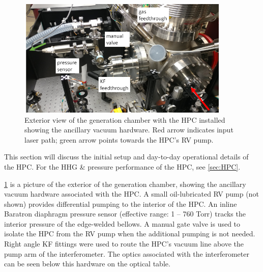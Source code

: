 \begin{figure}
	\centering
	\includegraphics[width=0.9\textwidth]{figures/app1/HPC_outside_view_lowres.png}
	\caption{Exterior view of the generation chamber with the HPC installed showing the ancillary vacuum hardware. Red arrow indicates input laser path; green arrow points towards the HPC's RV pump.}
	\label{fig:HPC_outside_view}
\end{figure}

This section will discuss the initial setup and day-to-day operational details of the HPC. For the HHG \& pressure performance of the HPC, see \cref{sec:HPC}.

\cref{fig:HPC_outside_view} is a picture of the exterior of the generation chamber, showing the ancillary vacuum hardware associated with the HPC. A small oil-lubricated RV pump (not shown) provides differential pumping to the interior of the HPC. An inline Baratron diaphragm pressure sensor (effective range: 1 -- 760 Torr) tracks the interior pressure of the edge-welded bellows. A manual gate valve is used to isolate the HPC from the RV pump when the additional pumping is not needed. Right angle KF fittings were used to route the HPC's vacuum line above the pump arm of the interferometer. The optics associated with the interferometer can be seen below this hardware on the optical table.

